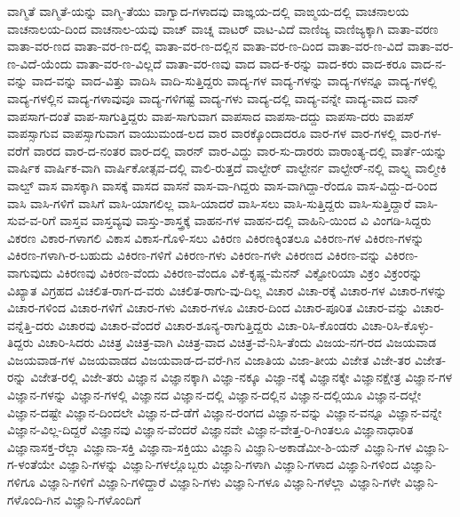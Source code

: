 {ವಾಗ್ಮಿತೆ
ವಾಗ್ಮಿತೆ-ಯನ್ನು
ವಾಗ್ಮಿ-ತೆಯು
ವಾಗ್ವಾದ-ಗಳಾದವು
ವಾಙ್ಞಯ-ದಲ್ಲಿ
ವಾಙ್ಮಯ-ದಲ್ಲಿ
ವಾಚನಾಲಯ
ವಾಚನಾಲಯ-ದಿಂದ
ವಾಚನಾಲ-ಯವು
ವಾಚ್
ವಾಚ್ನ
ವಾಟರ್
ವಾಟ-ವಿದೆ
ವಾಣಿಜ್ಯ
ವಾಣಿಜ್ಯಕ್ಕಾಗಿ
ವಾತಾ-ವರಣ
ವಾತಾ-ವರ-ಣದ
ವಾತಾ-ವರ-ಣ-ದಲ್ಲಿ
ವಾತಾ-ವರ-ಣ-ದಲ್ಲಿನ
ವಾತಾ-ವರ-ಣ-ದಿಂದ
ವಾತಾ-ವರ-ಣ-ವಿದೆ
ವಾತಾ-ವರ-ಣ-ವಿದೆ-ಯೆಂದು
ವಾತಾ-ವರ-ಣ-ವಿಲ್ಲದೆ
ವಾತಾ-ವರ-ಣವು
ವಾದ
ವಾದ-ಕ-ರನ್ನು
ವಾದ-ಕರು
ವಾದ-ಕರೂ
ವಾದ-ನ-ವನ್ನು
ವಾದ-ವನ್ನು
ವಾದ-ವಿತ್ತು
ವಾದಿಸಿ
ವಾದಿ-ಸುತ್ತಿದ್ದರು
ವಾದ್ಯ-ಗಳ
ವಾದ್ಯ-ಗಳನ್ನು
ವಾದ್ಯ-ಗಳನ್ನೂ
ವಾದ್ಯ-ಗಳಲ್ಲಿ
ವಾದ್ಯ-ಗಳಲ್ಲಿನ
ವಾದ್ಯ-ಗಳಾವುವೂ
ವಾದ್ಯ-ಗಳಿಗಷ್ಟೆ
ವಾದ್ಯ-ಗಳು
ವಾದ್ಯ-ದಲ್ಲಿ
ವಾದ್ಯ-ವನ್ನೇ
ವಾದ್ಯ-ವಾದ
ವಾನ್
ವಾಪಸಾಗ-ದಂತೆ
ವಾಪ-ಸಾಗುತ್ತಿದ್ದರು
ವಾಪ-ಸಾಗುವಾಗ
ವಾಪಸಾದ
ವಾಪಸಾ-ದದ್ದು
ವಾಪಸಾ-ದರು
ವಾಪಸ್
ವಾಪಸ್ಸಾಗುವ
ವಾಪಸ್ಸಾಗುವಾಗ
ವಾಯುಮಂಡ-ಲದ
ವಾರ
ವಾರಕ್ಕೊಂದಾದರೂ
ವಾರ-ಗಳ
ವಾರ-ಗಳಲ್ಲಿ
ವಾರ-ಗಳ-ವರೆಗೆ
ವಾರದ
ವಾರ-ದ-ನಂತರ
ವಾರ-ದಲ್ಲಿ
ವಾರನ್
ವಾರ-ವಿದ್ದು
ವಾರ-ಸು-ದಾರರು
ವಾರಾಂತ್ಯ-ದಲ್ಲಿ
ವಾರ್ತೆ-ಯನ್ನು
ವಾರ್ಷಿಕ
ವಾರ್ಷಿಕ-ವಾಗಿ
ವಾರ್ಷಿಕೋತ್ಸವ-ದಲ್ಲಿ
ವಾಲಿ-ರುತ್ತದೆ
ವಾಲ್ಟೇರ್
ವಾಲ್ಟೇರ್ನ
ವಾಲ್ಟೇರ್-ನಲ್ಲಿ
ವಾಲ್ಟ್ನ
ವಾಲ್ಮೀಕಿ
ವಾಲ್ವ್
ವಾಸ
ವಾಸಕ್ಕಾಗಿ
ವಾಸಕ್ಕೆ
ವಾಸದ
ವಾಸನೆ
ವಾಸ-ವಾ-ಗಿದ್ದರು
ವಾಸ-ವಾಗಿದ್ದಾ-ರೆಂದೂ
ವಾಸ-ವಿದ್ದು-ದ-ರಿಂದ
ವಾಸಿ
ವಾಸಿ-ಗಳಿಗೆ
ವಾಸಿಗೆ
ವಾಸಿ-ಯಾಗಲಿಲ್ಲ
ವಾಸಿ-ಯಾದರೆ
ವಾಸಿ-ಸಲು
ವಾಸಿ-ಸುತ್ತಿದ್ದರು
ವಾಸಿ-ಸುತ್ತಿದ್ದಾರೆ
ವಾಸಿ-ಸುವ-ವ-ರಿಗೆ
ವಾಸ್ತವ
ವಾಸ್ತವ್ಯವು
ವಾಸ್ತು-ಶಾಸ್ತ್ರಕ್ಕೆ
ವಾಹನ-ಗಳ
ವಾಹನ-ದಲ್ಲಿ
ವಾಹಿನಿ-ಯಿಂದ
ವಿ
ವಿಂಗಡಿ-ಸಿದ್ದರು
ವಿಕರಣ
ವಿಕಾರ-ಗಳಾಗಲಿ
ವಿಕಾಸ
ವಿಕಾಸ-ಗೊಳಿ-ಸಲು
ವಿಕಿರಣ
ವಿಕಿರಣಕ್ಕಿಂತಲೂ
ವಿಕಿರಣ-ಗಳ
ವಿಕಿರಣ-ಗಳನ್ನು
ವಿಕಿರಣ-ಗಳಾಗಿ-ರ-ಬಹುದು
ವಿಕಿರಣ-ಗಳಿಗೆ
ವಿಕಿರಣ-ಗಳು
ವಿಕಿರಣ-ಗಳೇ
ವಿಕಿರಣದ
ವಿಕಿರಣ-ವನ್ನು
ವಿಕಿರಣ-ವಾಗುವುದು
ವಿಕಿರಣವು
ವಿಕಿರಣ-ವೆಂದು
ವಿಕಿರಣ-ವೆಂದೂ
ವಿಕೆ-ಕೃಷ್ಣ-ಮೆನನ್
ವಿಕ್ಟೋರಿಯಾ
ವಿಕ್ರಂ
ವಿಕ್ರಂರನ್ನು
ವಿಖ್ಯಾತ
ವಿಗ್ರಹದ
ವಿಚಲಿತ-ರಾಗ-ದ-ವರು
ವಿಚಲಿತ-ರಾಗು-ವು-ದಿಲ್ಲ
ವಿಚಾರ
ವಿಚಾ-ರಕ್ಕೆ
ವಿಚಾರ-ಗಳ
ವಿಚಾರ-ಗಳನ್ನು
ವಿಚಾರ-ಗಳಿಂದ
ವಿಚಾರ-ಗಳಿಗೆ
ವಿಚಾರ-ಗಳು
ವಿಚಾರ-ಗಳೂ
ವಿಚಾರ-ದಿಂದ
ವಿಚಾರ-ಪೂರಿತ
ವಿಚಾರ-ವನ್ನು
ವಿಚಾರ-ವನ್ನೆತ್ತಿ-ದರು
ವಿಚಾರವು
ವಿಚಾರ-ವೆಂದರೆ
ವಿಚಾರ-ಶೂನ್ಯ-ರಾಗುತ್ತಿದ್ದರು
ವಿಚಾ-ರಿಸಿ-ಕೊಂಡರು
ವಿಚಾ-ರಿಸಿ-ಕೊಳ್ಳು-ತಿದ್ದರು
ವಿಚಾರಿ-ಸಿದರು
ವಿಚಿತ್ರ
ವಿಚಿತ್ರ-ವಾಗಿ
ವಿಚಿತ್ರ-ವಾದ
ವಿಚಿತ್ರ-ವೆ-ನಿಸಿ-ತೆಂದು
ವಿಜಯ-ನಗ-ರದ
ವಿಜಯವಾಡ
ವಿಜಯವಾಡ-ಗಳ
ವಿಜಯವಾಡದ
ವಿಜಯವಾಡ-ದ-ವರೆ-ಗಿನ
ವಿಜಾತಿಯ
ವಿಜಾ-ತೀಯ
ವಿಜೇತ
ವಿಜೇ-ತರ
ವಿಜೇತ-ರನ್ನು
ವಿಜೇತ-ರಲ್ಲಿ
ವಿಜೇ-ತರು
ವಿಜ್ಞಾನ
ವಿಜ್ಞಾನಕ್ಕಾಗಿ
ವಿಜ್ಞಾ-ನಕ್ಕೂ
ವಿಜ್ಞಾ-ನಕ್ಕೆ
ವಿಜ್ಞಾನಕ್ಕೇ
ವಿಜ್ಞಾನಕ್ಷೇತ್ರ
ವಿಜ್ಞಾನ-ಗಳ
ವಿಜ್ಞಾನ-ಗಳನ್ನು
ವಿಜ್ಞಾನ-ಗಳಲ್ಲಿ
ವಿಜ್ಞಾನದ
ವಿಜ್ಞಾನ-ದಲ್ಲಿ
ವಿಜ್ಞಾನ-ದಲ್ಲಿನ
ವಿಜ್ಞಾನ-ದಲ್ಲಿಯೂ
ವಿಜ್ಞಾನ-ದಲ್ಲೇ
ವಿಜ್ಞಾನ-ದಷ್ಟೇ
ವಿಜ್ಞಾನ-ದಿಂದಲೇ
ವಿಜ್ಞಾನ-ದೆ-ಡೆಗೆ
ವಿಜ್ಞಾನ-ರಂಗದ
ವಿಜ್ಞಾನ-ವನ್ನು
ವಿಜ್ಞಾನ-ವನ್ನೂ
ವಿಜ್ಞಾನ-ವನ್ನೇ
ವಿಜ್ಞಾನ-ವಿಲ್ಲ-ದಿದ್ದರೆ
ವಿಜ್ಞಾನವು
ವಿಜ್ಞಾನ-ವೆಂದರೆ
ವಿಜ್ಞಾನವೇ
ವಿಜ್ಞಾನ-ವೇತ್ತ-ರಿ-ಗಿಂತಲೂ
ವಿಜ್ಞಾನಾಧಾರಿತ
ವಿಜ್ಞಾನಾಸಕ್ತ-ರೆಲ್ಲಾ
ವಿಜ್ಞಾನಾ-ಸಕ್ತಿ
ವಿಜ್ಞಾನಾ-ಸಕ್ತಿಯು
ವಿಜ್ಞಾನಿ
ವಿಜ್ಞಾನಿ-ಅಕಾಡೆಮೀ-ಶಿ-ಯನ್
ವಿಜ್ಞಾನಿ-ಗಳ
ವಿಜ್ಞಾನಿ-ಗ-ಳಂತೆಯೇ
ವಿಜ್ಞಾನಿ-ಗಳನ್ನು
ವಿಜ್ಞಾನಿ-ಗಳಲ್ಲೊಬ್ಬರು
ವಿಜ್ಞಾನಿ-ಗಳಾಗಿ
ವಿಜ್ಞಾನಿ-ಗಳಾದ
ವಿಜ್ಞಾನಿ-ಗಳಿಂದ
ವಿಜ್ಞಾನಿ-ಗಳಿಗೂ
ವಿಜ್ಞಾನಿ-ಗಳಿಗೆ
ವಿಜ್ಞಾನಿ-ಗಳಿದ್ದಾರೆ
ವಿಜ್ಞಾನಿ-ಗಳು
ವಿಜ್ಞಾನಿ-ಗಳೂ
ವಿಜ್ಞಾನಿ-ಗಳೆಲ್ಲಾ
ವಿಜ್ಞಾನಿ-ಗಳೇ
ವಿಜ್ಞಾನಿ-ಗಳೊಂದಿ-ಗಿನ
ವಿಜ್ಞಾನಿ-ಗಳೊಂದಿಗೆ
}
